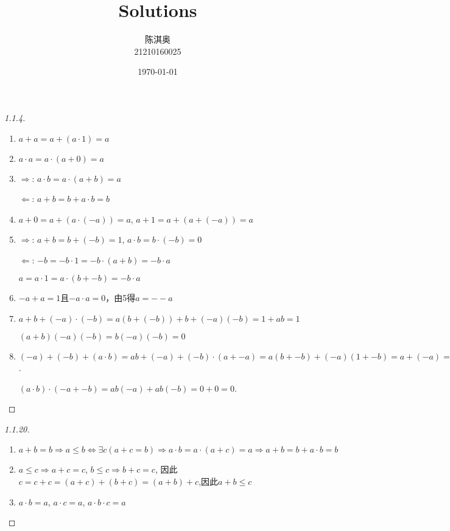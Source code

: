 \documentclass[11pt]{article}
\author{陈淇奥\\21210160025}
\date{\today}
\title{Solutions}
\begin{document}
\maketitle
\begin{proof}[1.1.4]
\begin{enumerate}
\item \(a+a=a+(a\cdot 1)=a\)
\item \(a\cdot a=a\cdot(a+0)=a\)
\item \(\Rightarrow\): \(a\cdot b=a\cdot(a+b)=a\)

\(\Leftarrow\): \(a+b=b+a\cdot b=b\)
\item \(a+0=a+(a\cdot(-a))=a\), \(a+1=a+(a+(-a))=a\)
\item \(\Rightarrow\): \(a+b=b+(-b)=1\), \(a\cdot b=b\cdot(-b)=0\)

\(\Leftarrow\): \(-b=-b\cdot 1=-b\cdot(a+b)=-b\cdot a\)

\(a=a\cdot 1=a\cdot (b+-b)=-b\cdot a\)
\item \(-a+a=1\)且\(-a\cdot a=0\)，由5得\(a=--a\)
\item \(a+b+(-a)\cdot(-b)=a(b+(-b))+b+(-a)(-b)=1+ab=1\)

\((a+b)(-a)(-b)=b(-a)(-b)=0\)
\item \((-a)+(-b)+(a\cdot b)=ab+(-a)+(-b)\cdot(a+-a)=a(b+-b)+(-a)(1+-b)=a+(-a)=1\).

\((a\cdot b)\cdot(-a+-b)=ab(-a)+ab(-b)=0+0=0\).
\end{enumerate}
\end{proof}

\begin{proof}[1.1.20]
\begin{enumerate}
\item \(a+b=b\Rightarrow a\le b\Leftrightarrow\exists c(a+c=b)\Rightarrow a\cdot b=a\cdot(a+c)=a\Rightarrow a+b=b+a\cdot b=b\)
\item \(a\le c\Rightarrow a+c=c\), \(b\le c\Rightarrow b+c=c\), 因此\(c=c+c=(a+c)+(b+c)=(a+b)+c\),因此\(a+b\le c\)
\item \(a\cdot b=a\), \(a\cdot c=a\), \(a\cdot b\cdot c=a\)
\end{enumerate}
\end{proof}
\end{document}

